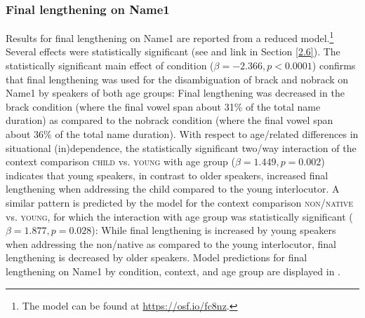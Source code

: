 \documentclass[output=paper]{langscibook}
\begin{document}
\subsubsection{Final lengthening on Name1}
Results for final lengthening on Name1 are reported from a reduced model.\footnote{The model can be found at \href{https://osf.io/fc8nz/?view_only=1974f7d0721049e2be0401c973234518}{https://osf.io/fc8nz}.} Several effects  were statistically significant (see  and link in Section \ref{2.6}). The statistically significant main effect of condition ($\beta = -2.366,\allowbreak p< 0.0001$) confirms that final lengthening was used for the disambiguation of brack and nobrack on Name1 by speakers of both age groups: Final lengthening was decreased in the brack condition (where the final vowel span about 31\% of the total name duration) as compared to the nobrack condition (where the final vowel span about 36\% of the total name duration). With respect to age\-/related differences in situational (in)de\-pen\-dence, the statistically significant two\-/way interaction of the context comparison \textsc{child} vs. \textsc{young} with age group ($\beta = 1.449,\allowbreak p = 0.002$) indicates that young speakers, in contrast to older speakers, increased final lengthening when addressing the child compared to the young interlocutor. A similar pattern is predicted by the model for the context comparison \textsc{non\-/native} vs. \textsc{young}, for which the interaction with age group was statistically significant ($\beta = 1.877,\allowbreak p = 0.028$): While final lengthening is increased by young speakers when addressing the non\-/native as compared to the young interlocutor, final lengthening is decreased by older speakers. Model predictions for final lengthening on Name1 by condition, context, and age group are displayed in .
\end{document}
